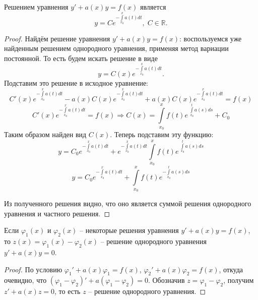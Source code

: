     \begin{proposition}
        Решением уравнения $y' + a(x) y = f(x)$ является
        \begin{equation}
            y = C e^{-\int\limits_{x_0}^{x} a(t) dt}, \; C \in \mathbb{R}.
        \end{equation}
    \end{proposition}

    \begin{proof}
        Найдём решение уравнения $y' + a(x) y = f(x)$: воспользуемся уже найденным решением однородного уравнения, применяя метод вариации постоянной. То есть будем искать решение в виде
        \begin{equation}
            y = C(x) e^{-\int\limits_{x_0}^{x} a(t) dt}.
        \end{equation}
        Подставим это решение в исходное уравнение:
        \begin{equation}
            C'(x) e^{-\int\limits_{x_0}^{x} a(t) dt} - a(x) C(x) e^{-\int\limits_{x_0}^{x} a(t) dt} + a(x) C(x) e^{-\int\limits_{x_0}^{x} a(t) dt} = f(x)
        \end{equation}
        \begin{equation}
            C'(x) e^{-\int\limits_{x_0}^{x} a(t) dt} = f(x) \Rightarrow C(x) = \int\limits_{x_0}^{x} f(t) e^{\; \int\limits_{x_0}^{t} a(s) ds} + C_0
        \end{equation}
        Таким образом найден вид $C(x)$. Теперь подставим эту функцию:
        \begin{equation}
            y = C_0 e^{-\int\limits_{x_0}^{x} a(t) dt} + e^{-\int\limits_{x_0}^{x} a(t) dt} \int\limits_{x_0}^{x} f(t) e^{\; \int\limits_{x_0}^{t} a(s) ds}
        \end{equation}
        \begin{equation}
            y = C_0 e^{-\int\limits_{x_0}^{x} a(t) dt} + \int\limits_{x_0}^{x} f(t) e^{- \int\limits_{x_0}^{t} a(s) ds}
        \end{equation}
        
        Из полученного решения видно, что оно является суммой решения однородного уравнения и частного решения. 
    \end{proof}

    \begin{proposition}
        Если $\varphi_1(x)$ и $\varphi_2(x)$ -- некоторые решения уравнения $y' + a(x) y = f(x)$, то $z(x) = \varphi_1(x) - \varphi_2(x)$ -- решение однородного уравнения $y' + a(x) y = 0$.
    \end{proposition}

    \begin{proof}
        По условию $\varphi_1' + a(x) \varphi_1 = f(x)$, $\varphi_2' + a(x) \varphi_2 = f(x)$, откуда очевидно, что $(\varphi_1 - \varphi_2)' + a (\varphi_1 - \varphi_2) = 0$. Обозначив $z = \varphi_1 - \varphi_2$, получим $z' + a(x) z = 0$, то есть $z$ -- решение однородного уравнения.
    \end{proof}
    

